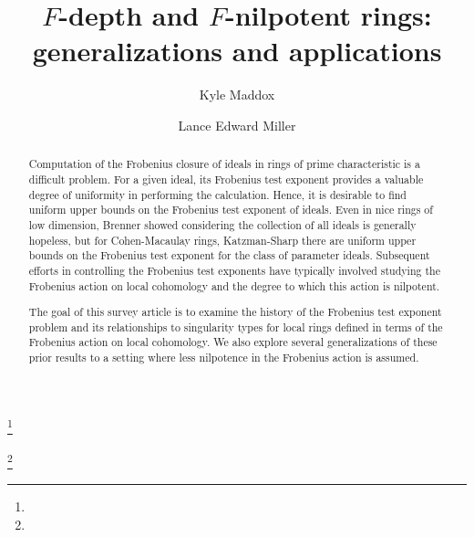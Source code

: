 \documentclass{amsproc}
\theoremstyle{definition}
\theoremstyle{remark}
\numberwithin{equation}{section}
\begin{document}
\title{}




\author{Kyle Maddox}
\address{}
\curraddr{}
\email{}
\thanks{}


\author{Lance Edward Miller}
\address{}
\curraddr{}
\email{}
\thanks{}








\title{\texorpdfstring{$F$}{F}-depth and \texorpdfstring{$F$}{F}-nilpotent rings: generalizations and applications}

\begin{abstract}
Computation of the Frobenius closure of ideals in rings of prime characteristic is a difficult problem. For a given ideal, its Frobenius test exponent provides a valuable degree of uniformity in performing the calculation. Hence, it is desirable to find uniform upper bounds on the Frobenius test exponent of ideals. Even in nice rings of low dimension, Brenner showed considering the collection of all ideals is generally hopeless, but for Cohen-Macaulay rings, Katzman-Sharp there are uniform upper bounds on the Frobenius test exponent for the class of parameter ideals. Subsequent efforts in controlling the Frobenius test exponents have typically involved studying the Frobenius action on local cohomology and the degree to which this action is nilpotent. 

The goal of this survey article is to examine the history of the Frobenius test exponent problem and its relationships to singularity types for local rings defined in terms of the Frobenius action on local cohomology. We also explore several generalizations of these prior results to a setting where less nilpotence in the Frobenius action is assumed. 

\end{abstract}


\maketitle
\end{document}
